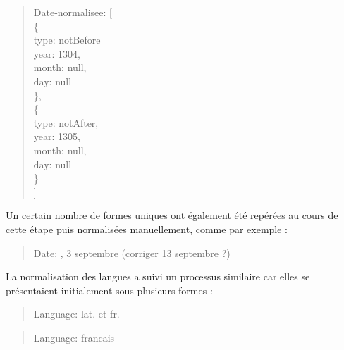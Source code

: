 \documentclass[a4paper,12pt,twoside]{book}
\begin{document}
	\begin{quotation}
				\textquotesingle Date-normalisee\textquotesingle : [\\
				\indent\indent		\{ \\
				\indent\indent		\textquotesingle type\textquotesingle : \textquotesingle notBefore\textquotesingle \\
				\indent\indent		\textquotesingle year\textquotesingle : 1304,\\
				\indent\indent		\textquotesingle month\textquotesingle : null,\\
				\indent\indent		\textquotesingle day\textquotesingle : null\\
				\indent\indent	\},\\
				\indent\indent	\{\\
				\indent\indent		\textquotesingle type\textquotesingle : \textquotesingle notAfter\textquotesingle ,\\
				\indent\indent		\textquotesingle year\textquotesingle : 1305,\\
				\indent\indent		\textquotesingle month\textquotesingle : null,\\
				\indent\indent		\textquotesingle day\textquotesingle : null\\
				\indent\indent	\}\\
				\indent	]\\
	\end{quotation}
	
	\noindent Un certain nombre de formes uniques ont également été repérées au cours de cette étape puis normalisées manuellement, comme par exemple :
	
	\begin{quotation}
		\textquotesingle Date\textquotesingle : , 3 septembre (corriger 13 septembre ?)\textquotesingle
	\end{quotation}

	\noindent La normalisation des langues a suivi un processus similaire car elles se présentaient initialement sous plusieurs formes :
	
	\begin{quotation}
		\textquotesingle Language\textquotesingle : \textquotesingle lat. et fr.\textquotesingle
	\end{quotation}

	\begin{quotation}
		\textquotesingle Language\textquotesingle : \textquotesingle francais\textquotesingle
	\end{quotation}
	
\end{document}
